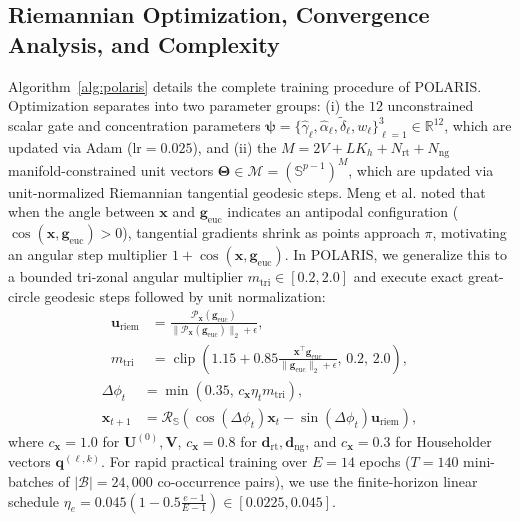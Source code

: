\documentclass[journal]{IEEEtran}
\begin{document}
\subsection{Riemannian Optimization, Convergence Analysis, and Complexity}
Algorithm~\ref{alg:polaris} details the complete training procedure of POLARIS. Optimization separates into two parameter groups: (i) the $12$ unconstrained scalar gate and concentration parameters $\boldsymbol{\psi} = \{\hat{\gamma}_\ell, \hat{\alpha}_\ell, \tilde{\delta}_\ell, w_\ell\}_{\ell=1}^3 \in \mathbb{R}^{12}$, which are updated via Adam ($\text{lr}=0.025$), and (ii) the $M = 2V + LK_h + N_{\text{rt}} + N_{\text{ng}}$ manifold-constrained unit vectors $\boldsymbol{\Theta} \in \mathcal{M} = (\mathbb{S}^{p-1})^M$, which are updated via unit-normalized Riemannian tangential geodesic steps. Meng et al. \cite{meng2019spherical} noted that when the angle between $\mathbf{x}$ and $\mathbf{g}_{\text{euc}}$ indicates an antipodal configuration ($\cos(\mathbf{x}, \mathbf{g}_{\text{euc}}) > 0$), tangential gradients shrink as points approach $\pi$, motivating an angular step multiplier $1 + \cos(\mathbf{x}, \mathbf{g}_{\text{euc}})$. In POLARIS, we generalize this to a bounded tri-zonal angular multiplier $m_{\text{tri}} \in [0.2, 2.0]$ and execute exact great-circle geodesic steps followed by unit normalization:
\begin{equation}
\begin{aligned}
\mathbf{u}_{\text{riem}} &= \frac{\mathcal{P}_{\mathbf{x}}(\mathbf{g}_{\text{euc}})}{\|\mathcal{P}_{\mathbf{x}}(\mathbf{g}_{\text{euc}})\|_2 + \epsilon}, \\
m_{\text{tri}} &= \operatorname{clip}\!\left(1.15 + 0.85\frac{\mathbf{x}^\top\mathbf{g}_{\text{euc}}}{\|\mathbf{g}_{\text{euc}}\|_2 + \epsilon}, \, 0.2, \, 2.0\right),
\end{aligned}
\label{eq:riem_dir}
\end{equation}
\begin{equation}
\begin{aligned}
\Delta\phi_t &= \min\!\left(0.35, \, c_{\mathbf{x}}\eta_t m_{\text{tri}}\right), \\
\mathbf{x}_{t+1} &= \mathcal{R}_{\mathbb{S}}\!\left(\cos(\Delta\phi_t)\mathbf{x}_t - \sin(\Delta\phi_t)\mathbf{u}_{\text{riem}}\right),
\end{aligned}
\label{eq:geodesic_step}
\end{equation}
where $c_{\mathbf{x}} = 1.0$ for $\mathbf{U}^{(0)}, \mathbf{V}$, $c_{\mathbf{x}} = 0.8$ for $\mathbf{d}_{\text{rt}}, \mathbf{d}_{\text{ng}}$, and $c_{\mathbf{x}} = 0.3$ for Householder vectors $\mathbf{q}^{(\ell,k)}$. For rapid practical training over $E = 14$ epochs ($T = 140$ mini-batches of $|\mathcal{B}| = 24,000$ co-occurrence pairs), we use the finite-horizon linear schedule $\eta_e = 0.045(1 - 0.5\frac{e-1}{E-1}) \in [0.0225, 0.045]$.
\end{document}
